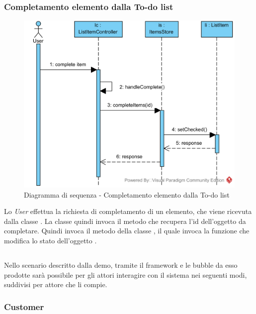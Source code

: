 \subsubsection{Completamento elemento dalla To-do list}
\begin{figure}[H]
	\centering
	\includegraphics[width=15cm]{./diagrammi/sequenza/completa_elemento_todo.png}
	\caption{Diagramma di sequenza - Completamento elemento dalla To-do list}
\end{figure}
Lo \textit{User} effettua la richiesta di completamento di un elemento, che viene ricevuta dalla classe . La classe quindi invoca il metodo  che recupera l'id dell'oggetto da completare. Quindi invoca il metodo  della classe , il quale invoca la funzione  che modifica lo stato dell'oggetto .

\subsection{\DemoName}
Nello scenario descritto dalla demo, tramite il framework e le bubble da esso prodotte sarà possibile per gli attori interagire con il sistema nei seguenti modi, suddivisi per attore che li compie.

\subsubsection{Customer}

